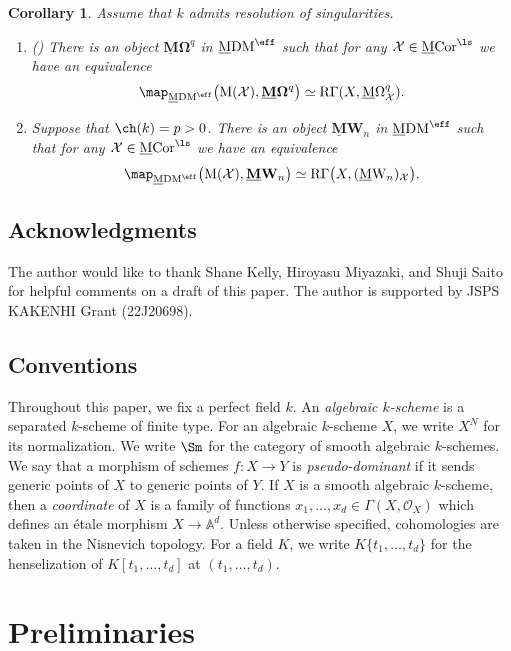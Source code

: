 \documentclass{amsart}
\theoremstyle{plain}
\newtheorem{corollary}[theorem]{Corollary}
\theoremstyle{definition}
\theoremstyle{remark}
\numberwithin{equation}{section}
\def\MCor{\mathrm{\underline{M}Cor}}
\def\MDM{\mathrm{\underline{M}DM}}
\def\MOmega{\mathrm{\underline{M}\Omega}}
\def\boldMOmega{\mathbf{\underline{M}\Omega}}
\def\MW{\underline{\mathrm{M}}\mathrm{W}}
\def\boldMW{\underline{\mathbf{M}}\mathbf{W}}
\begin{document}
\begin{corollary}\label{cor:realization}
	Assume that $k$ admits resolution of singularities.
	\begin{enumerate}
		\item	(\cite[Theorem 1.3]{KellyMiyazaki_Hodge2}) There is an object $\boldMOmega^q$ in $\MDM^\eff$ such that for any $\mathcal{X}\in \MCor^\ls$ we have an equivalence
				$$
					\map_{\MDM^\eff}\bigl(\mathrm{M}(\mathcal{X}),\boldMOmega^q\bigr) \simeq \mathrm{R}\Gamma(X,\MOmega^q_\mathcal{X}).
				$$
		\item	Suppose that $\ch(k)=p>0$.
				There is an object $\boldMW_n$ in $\MDM^\eff$ such that for any $\mathcal{X}\in \MCor^\ls$ we have an equivalence
				$$
					\map_{\MDM^\eff}\bigl(\mathrm{M}(\mathcal{X}),\boldMW_n\bigr) \simeq \mathrm{R}\Gamma\bigl(X,(\MW_n)_\mathcal{X}\bigr).
				$$
	\end{enumerate}
\end{corollary}

\subsection*{Acknowledgments}
The author would like to thank Shane Kelly, Hiroyasu Miyazaki, and Shuji Saito for helpful comments on a draft of this paper.
The author is supported by JSPS KAKENHI Grant (22J20698).


\subsection*{Conventions}
Throughout this paper, we fix a perfect field $k$.
An \emph{algebraic $k$-scheme} is a separated $k$-scheme of finite type.
For an algebraic $k$-scheme $X$, we write $X^N$ for its normalization.
We write $\Sm$ for the category of smooth algebraic $k$-schemes.
We say that a morphism of schemes $f\colon X\to Y$ is \emph{pseudo-dominant} if it sends generic points of $X$ to generic points of $Y$.
If $X$ is a smooth algebraic $k$-scheme, then a \emph{coordinate} of $X$ is a family of functions $x_1,\dots,x_d\in \Gamma(X,\mathcal{O}_X)$ which defines an \'etale morphism $X\to \mathbb{A}^d$.
Unless otherwise specified, cohomologies are taken in the Nisnevich topology.
For a field $K$, we write $K\{t_1,\dots,t_d\}$ for the henselization of $K[t_1,\dots,t_d]$ at $(t_1,\dots,t_d)$.


\section{Preliminaries}
\end{document}

